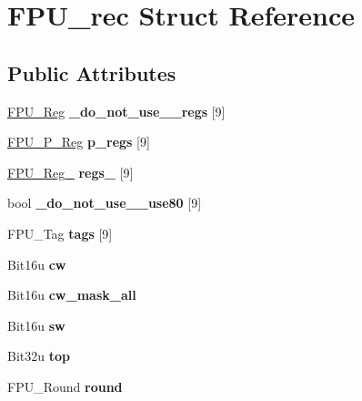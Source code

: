 \hypertarget{structFPU__rec}{\section{F\-P\-U\-\_\-rec Struct Reference}
\label{structFPU__rec}
}
\subsection*{Public Attributes}
\begin{DoxyCompactItemize}
\item 
\hypertarget{structFPU__rec_afa2a3aa9ee62180a25382e765b35aee3}{\hyperlink{unionFPU__Reg}{F\-P\-U\-\_\-\-Reg} {\bfseries \-\_\-do\-\_\-not\-\_\-use\-\_\-\-\_\-regs} \mbox{[}9\mbox{]}}\label{structFPU__rec_afa2a3aa9ee62180a25382e765b35aee3}

\item 
\hypertarget{structFPU__rec_a6da617e9c746655ad63647cbdd8ebca2}{\hyperlink{structFPU__P__Reg}{F\-P\-U\-\_\-\-P\-\_\-\-Reg} {\bfseries p\-\_\-regs} \mbox{[}9\mbox{]}}\label{structFPU__rec_a6da617e9c746655ad63647cbdd8ebca2}

\item 
\hypertarget{structFPU__rec_a4cc16cfe7ad0e6573f20468e0dfc2cb2}{\hyperlink{unionFPU__Reg__80}{F\-P\-U\-\_\-\-Reg\-\_} {\bfseries regs\-\_} \mbox{[}9\mbox{]}}\label{structFPU__rec_a4cc16cfe7ad0e6573f20468e0dfc2cb2}

\item 
\hypertarget{structFPU__rec_ac52ee3983fa61daadebbe6b52d8ea5d2}{bool {\bfseries \-\_\-do\-\_\-not\-\_\-use\-\_\-\-\_\-use80} \mbox{[}9\mbox{]}}\label{structFPU__rec_ac52ee3983fa61daadebbe6b52d8ea5d2}

\item 
\hypertarget{structFPU__rec_a5c968eb9b019de7d023d7a04eeba543a}{F\-P\-U\-\_\-\-Tag {\bfseries tags} \mbox{[}9\mbox{]}}\label{structFPU__rec_a5c968eb9b019de7d023d7a04eeba543a}

\item 
\hypertarget{structFPU__rec_a2e577292d3ea233f39af491ae84dce91}{Bit16u {\bfseries cw}}\label{structFPU__rec_a2e577292d3ea233f39af491ae84dce91}

\item 
\hypertarget{structFPU__rec_a79bb0307ec0aff5444c09d24220de9d7}{Bit16u {\bfseries cw\-\_\-mask\-\_\-all}}\label{structFPU__rec_a79bb0307ec0aff5444c09d24220de9d7}

\item 
\hypertarget{structFPU__rec_a2c55462f6b2e5cffdd65018b8d705897}{Bit16u {\bfseries sw}}\label{structFPU__rec_a2c55462f6b2e5cffdd65018b8d705897}

\item 
\hypertarget{structFPU__rec_a7d74350fff14f21617d60783303c990d}{Bit32u {\bfseries top}}\label{structFPU__rec_a7d74350fff14f21617d60783303c990d}

\item 
\hypertarget{structFPU__rec_a624978ca4690aebef50e4ae884e77b86}{F\-P\-U\-\_\-\-Round {\bfseries round}}\label{structFPU__rec_a624978ca4690aebef50e4ae884e77b86}

\end{DoxyCompactItemize}


